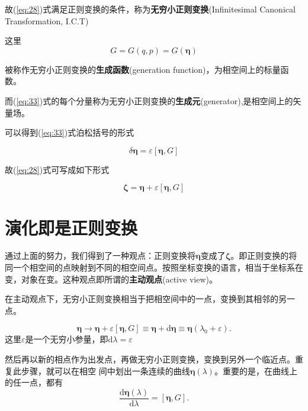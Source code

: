 \documentclass[12pt]{ctexart}
\begin{document}
故(\ref{eq:28})式满足正则变换的条件，称为\textbf{无穷小正则变换}(Infinitesimal Canonical Transformation, I.C.T)

这里
\begin{equation}
    G=G(q,p)=G(\boldsymbol{\eta})
\end{equation}

被称作无穷小正则变换的\textbf{生成函数}(generation function)，为相空间上的标量函数。

而(\ref{eq:33})式的每个分量称为无穷小正则变换的\textbf{生成元}(generator),是相空间上的矢量场。

可以得到(\ref{eq:33})式泊松括号的形式

\begin{equation}
    \delta \boldsymbol{\eta}=\varepsilon  [ \boldsymbol{\eta},G  ]
\end{equation}

故(\ref{eq:28})式可写成如下形式

\begin{equation}
\boxed{\boldsymbol{\zeta}=\boldsymbol{\eta} + \varepsilon[ \boldsymbol{\eta},G ]}
\end{equation}
\section{演化即是正则变换}
通过上面的努力，我们得到了一种观点：正则变换将$\boldsymbol{\eta}$变成了$\boldsymbol{\zeta}$。即正则变换的将同一个相空间的点映射到不同的相空间点。按照坐标变换的语言，相当于坐标系在变，对象在变。这种观点即所谓的\textbf{主动观点}(active view)。

在主动观点下，无穷小正则变换相当于把相空间中的一点，变换到其相邻的另一点。

\begin{equation}
    \boldsymbol{\eta}\to\boldsymbol{\eta}+\varepsilon[\boldsymbol{\eta},G]\equiv\boldsymbol{\eta}+\mathrm{d}\boldsymbol{\eta}\equiv\boldsymbol{\eta}(\lambda_0 +\varepsilon).
    \end{equation}
    这里$\varepsilon$是一个无穷小参量，即$\mathrm{d}\lambda=\varepsilon$

然后再以新的相点作为出发点，再做无穷小正则变换，变换到另外一个临近点。重复此步骤，就可以在相空
间中划出一条连续的曲线$\boldsymbol{\eta}\left(\lambda\right)$。重要的是，在曲线上的任一点，都有
\begin{equation}\boxed{\frac{\mathrm{d}\boldsymbol{\eta}\left(\lambda\right)}{\mathrm{d}\lambda}=[\boldsymbol{\eta},G]}.
    \label{eq:42}
\end{equation}
\end{document}

